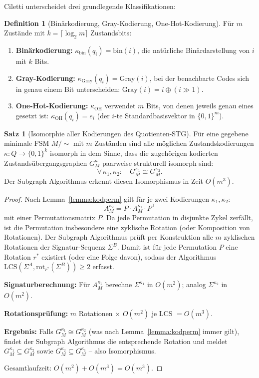 ﻿\documentclass[a4paper,12pt]{article}
\theoremstyle{definition}
\newtheorem{definition}{Definition}
\newtheorem{satz}{Satz}
\begin{document}
Ciletti \cite[S.~96--100]{ciletti2011} unterscheidet drei grundlegende Klassifikationen:

\begin{definition}[Binärkodierung, Gray-Kodierung, One-Hot-Kodierung]
  Für $m$ Zustände mit $k = \lceil \log_2 m \rceil$ Zustandsbits:
  \begin{enumerate}
    \item \textbf{Binärkodierung:} $\kappa_{\text{bin}}(q_i) = \text{bin}(i)$, die
          natürliche Binärdarstellung von $i$ mit $k$ Bits.
    \item \textbf{Gray-Kodierung:} $\kappa_{\text{Gray}}(q_i) = \text{Gray}(i)$,
          bei der benachbarte Codes sich in genau einem Bit unterscheiden:
          $\text{Gray}(i) = i \oplus (i \gg 1)$.
    \item \textbf{One-Hot-Kodierung:} $\kappa_{\text{OH}}$ verwendet $m$ Bits, von
          denen jeweils genau eines gesetzt ist: $\kappa_{\text{OH}}(q_i) = e_i$
          (der $i$-te Standardbasisvektor in $\{0,1\}^m$).
  \end{enumerate}
\end{definition}

\begin{satz}[Isomorphie aller Kodierungen des Quotienten-STG]\label{satz:iso_kodierungen}
  Für eine gegebene minimale FSM $M/{\sim}$ mit $m$ Zuständen sind alle möglichen
  Zustandskodierungen $\kappa: Q \to \{0,1\}^k$ isomorph in dem Sinne, dass die
  zugehörigen kodierten Zustandsübergangsgraphen $G_M^{\kappa}$ paarweise strukturell
  isomorph sind:
  \[
    \forall\, \kappa_1, \kappa_2: \quad G_M^{\kappa_1} \cong G_M^{\kappa_2}.
  \]
  Der Subgraph Algorithmus erkennt diesen Isomorphismus in Zeit $O(m^3)$.
\end{satz}

\begin{proof}
  Nach Lemma~\ref{lemma:kodperm} gilt für je zwei Kodierungen $\kappa_1, \kappa_2$:
  \[
    A_M^{\kappa_2} = P \cdot A_M^{\kappa_1} \cdot P^\top
  \]
  mit einer Permutationsmatrix $P$. Da jede Permutation in disjunkte Zykel zerfällt,
  ist die Permutation insbesondere eine zyklische Rotation (oder Komposition von
  Rotationen). Der Subgraph Algorithmus prüft per Konstruktion alle $m$ zyklischen
  Rotationen der Signatur-Sequenz $\Sigma^B$. Damit ist für jede Permutation $P$
  eine Rotation $r^*$ existiert (oder eine Folge davon), sodass der Algorithmus
  $\text{LCS}(\Sigma^A, \text{rot}_{r^*}(\Sigma^B)) \geq 2$ erfasst.

  \textbf{Signaturberechnung:} Für $A_M^{\kappa_1}$ berechne $\Sigma^{\kappa_1}$ in
  $O(m^2)$; analog $\Sigma^{\kappa_2}$ in $O(m^2)$.

  \textbf{Rotationsprüfung:} $m$ Rotationen $\times$ $O(m^2)$ je LCS $= O(m^3)$.

  \textbf{Ergebnis:} Falls $G_M^{\kappa_1} \cong G_M^{\kappa_2}$ (was nach
  Lemma~\ref{lemma:kodperm} immer gilt), findet der Subgraph Algorithmus die
  entsprechende Rotation und meldet $G_M^{\kappa_1} \subseteq G_M^{\kappa_2}$ sowie
  $G_M^{\kappa_2} \subseteq G_M^{\kappa_1}$ -- also Isomorphismus.

  Gesamtlaufzeit: $O(m^2) + O(m^3) = O(m^3)$.
\end{proof}
\end{document}
